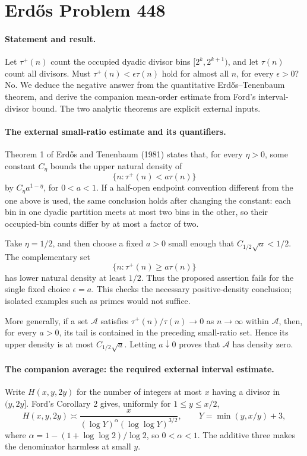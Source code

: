 \section*{Erd\H{o}s Problem 448}

\paragraph{Statement and result.}
Let \(\tau^+(n)\) count the occupied dyadic divisor bins
\([2^k,2^{k+1})\), and let \(\tau(n)\) count all divisors.
Must \(\tau^+(n)<\epsilon\tau(n)\) hold for almost all \(n\),
for every \(\epsilon>0\)?
No. We deduce the negative answer from the quantitative
Erd\H{o}s--Tenenbaum theorem, and derive the companion mean-order
estimate from Ford's interval-divisor bound. The two analytic
theorems are explicit external inputs.

\paragraph{The external small-ratio estimate and its quantifiers.}
Theorem 1 of Erd\H{o}s and Tenenbaum (1981) states that, for every
\(\eta>0\), some constant \(C_\eta\) bounds the upper natural density
of
\[
 \{n:\tau^+(n)<a\tau(n)\}
\]
by \(C_\eta a^{1-\eta}\), for \(0<a<1\).
If a half-open endpoint convention different from the one above is
used, the same conclusion holds after changing the constant: each
bin in one dyadic partition meets at most two bins in the other,
so their occupied-bin counts differ by at most a factor of two.

Take \(\eta=1/2\), and then choose a fixed \(a>0\) small enough that
\(C_{1/2}\sqrt a<1/2\). The complementary set
\[
 \{n:\tau^+(n)\geq a\tau(n)\}
 \tag{1}
\]
has lower natural density at least \(1/2\).
Thus the proposed assertion fails for the single fixed choice
\(\epsilon=a\). This checks the necessary positive-density conclusion;
isolated examples such as primes would not suffice.

More generally, if a set \(\mathcal A\) satisfies
\(\tau^+(n)/\tau(n)\to0\) as \(n\to\infty\) within \(\mathcal A\),
then, for every \(a>0\), its tail is contained in the preceding
small-ratio set. Hence its upper density is at most \(C_{1/2}\sqrt a\).
Letting \(a\downarrow0\) proves that \(\mathcal A\) has density zero.

\paragraph{The companion average: the required external interval estimate.}
Write \(H(x,y,2y)\) for the number of integers at most \(x\)
having a divisor in \((y,2y]\).
Ford's Corollary 2 gives, uniformly for \(1\leq y\leq x/2\),
\[
 H(x,y,2y)\asymp
 \frac{x}{(\log Y)^\alpha(\log\log Y)^{3/2}},
 \qquad Y=\min(y,x/y)+3,
 \tag{2}
\]
where \(\alpha=1-(1+\log\log2)/\log2\), so \(0<\alpha<1\).
The additive three makes the denominator harmless at small \(y\).

